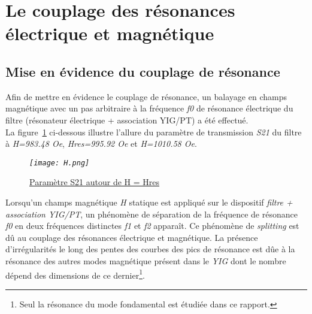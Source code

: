 \documentclass[12pt,fleqn]{book} %
\begin{document}
\section{Le couplage des résonances électrique et magnétique}
\subsection{Mise en évidence du couplage de résonance}
\noindent Afin de mettre en évidence le couplage de résonance, un balayage en champs magnétique avec un pas arbitraire à la fréquence \emph{f0} de résonance électrique du filtre (résonateur électrique + association YIG/PT) a été effectué.
~\\La figure~\underline{\color{blue}\ref{Hres}} ci-dessous illustre l'allure du paramètre de transmission \emph{S21} du filtre à \emph{H=983.48 Oe}, \emph{Hres=995.92 Oe} et \emph{H=1010.58 Oe}.
\begin{figure}[H]
	\centering
	\itshape
	\texttt{[image: H.png]}
	\caption{\label{Hres} \underline{Paramètre S21 autour de H = Hres}}
\end{figure}
\noindent Lorsqu'un champs magnétique \emph{H} statique est appliqué sur le dispositif \emph{filtre + association YIG/PT}, un phénomène de séparation de la fréquence de résonance \emph{f0} en deux fréquences distinctes \emph{f1} et \emph{f2} apparaît. Ce phénomène de \emph{splitting} est dû au couplage des résonances électrique et magnétique.
La présence d'irrégularités le long des pentes des courbes des pics de résonance est dûe à la résonance des autres modes magnétique présent dans le \emph{YIG} dont le nombre dépend des dimensions de ce dernier\footnote{Seul la résonance du mode fondamental est étudiée dans ce rapport.}. 
\end{document}
